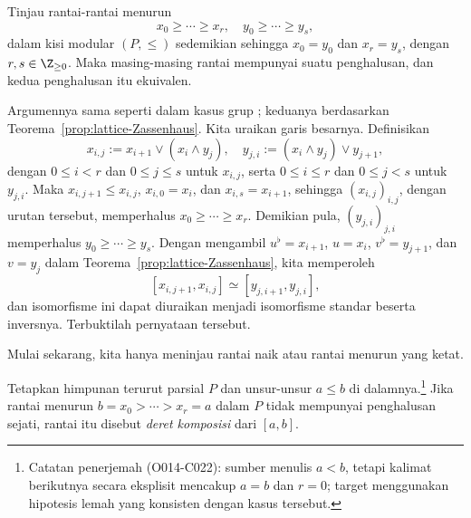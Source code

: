 \begin{teorema}\label{prop:Schreier-refinement}
	\mbox{}\par
	Tinjau rantai-rantai menurun
	\[ x_0 \geq \cdots \geq x_r, \quad y_0 \geq \cdots \geq y_s, \]
	dalam kisi modular $(P,\leq)$ sedemikian sehingga $x_0=y_0$ dan $x_r=y_s$,
	dengan $r,s \in \Z_{\geq 0}$. Maka masing-masing rantai mempunyai suatu
	penghalusan, dan kedua penghalusan itu ekuivalen.
\end{teorema}
\begin{bukti}
	Argumennya sama seperti dalam kasus grup \cite[Teorema 4.6.6]{Li1}; keduanya
	berdasarkan Teorema~\ref{prop:lattice-Zassenhaus}. Kita uraikan garis
	besarnya. Definisikan
	\[ x_{i, j} := x_{i+1} \vee (x_i \wedge y_j), \quad y_{j, i} := (x_i \wedge y_j) \vee y_{j+1}, \]
	dengan $0 \leq i<r$ dan $0 \leq j \leq s$ untuk $x_{i,j}$, serta
	$0 \leq i \leq r$ dan $0 \leq j<s$ untuk $y_{j,i}$. Maka
	$x_{i,j+1} \leq x_{i,j}$, $x_{i,0}=x_i$, dan $x_{i,s}=x_{i+1}$, sehingga
	$\left(x_{i,j}\right)_{i,j}$, dengan urutan tersebut, memperhalus
	$x_0 \geq \cdots \geq x_r$. Demikian pula,
	$\left(y_{j,i}\right)_{j,i}$ memperhalus $y_0 \geq \cdots \geq y_s$.
	Dengan mengambil $u^\flat=x_{i+1}$, $u=x_i$, $v^\flat=y_{j+1}$, dan
	$v=y_j$ dalam Teorema~\ref{prop:lattice-Zassenhaus}, kita memperoleh
	\[ \left[ x_{i, j+1}, x_{i,j} \right] \simeq \left[ y_{j, i+1}, y_{j, i} \right], \]
	dan isomorfisme ini dapat diuraikan menjadi isomorfisme standar beserta
	inversnya. Terbuktilah pernyataan tersebut.
\end{bukti}

Mulai sekarang, kita hanya meninjau rantai naik atau rantai menurun yang ketat.

\begin{definisi}
	Tetapkan himpunan terurut parsial $P$ dan unsur-unsur $a\leq b$ di
	dalamnya.\footnote{Catatan penerjemah (O014-C022): sumber menulis $a<b$,
	tetapi kalimat berikutnya secara eksplisit mencakup $a=b$ dan $r=0$; target
	menggunakan hipotesis lemah yang konsisten dengan kasus tersebut.} Jika
	rantai menurun $b=x_0>\cdots>x_r=a$ dalam $P$ tidak mempunyai penghalusan
	sejati, rantai itu disebut \emph{deret komposisi} dari $[a,b]$.
\end{definisi}

